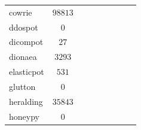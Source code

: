 \begin{table}
\begin{tabularx}{\linewidth}{l|cc|cccccc}
        cowrie \cite{cowire2021}                 & $98813$                               &                                          &                                 &                                    &                 &                     &                 &                     \\
        ddospot \cite{ddosspot2021}              & $0$                                   &                                          &                                 &                                    &                 &                     &                 &                     \\
        dicompot \cite{dicompot2021}             & $27$                                  &                                          &                                 &                                    &                 &                     &                 &                     \\
        dionaea \cite{dionaea2021}               & $3293$                                &                                          &                                 &                                    &                 &                     &                 &                     \\
        elasticpot \cite{elasticpot2021}         & $531$                                 &                                          &                                 &                                    &                 &                     &                 &                     \\
        glutton \cite{glutton2021}               & $0$                                   &                                          &                                 &                                    &                 &                     &                 &                     \\
        heralding \cite{heralding2021}           & $35843$                               &                                          &                                 &                                    &                 &                     &                 &                     \\
        honeypy \cite{honeysap2021}              & $0$                                   &                                          &                                 &                                    &                 &                     &                 &                     \\

\end{tabularx}
\end{table}
